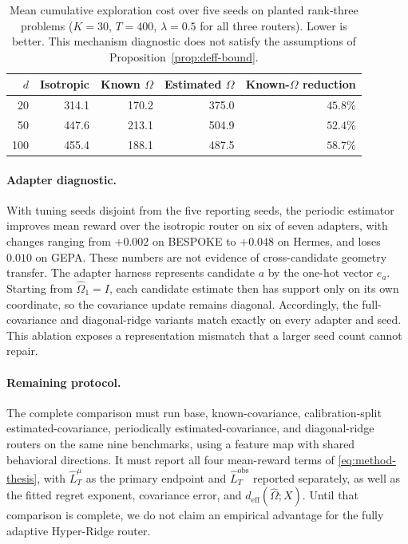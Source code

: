\documentclass{article} %
\begin{document}
\begin{table}[H]
\centering
\small
\begin{tabular}{rrrrr}
\toprule
$d$ & Isotropic & Known $\Omega$ & Estimated $\Omega$ & Known-$\Omega$ reduction \\
\midrule
20  & 314.1 & 170.2 & 375.0 & $45.8\%$ \\
50  & 447.6 & 213.1 & 504.9 & $52.4\%$ \\
100 & 455.4 & 188.1 & 487.5 & $58.7\%$ \\
\bottomrule
\end{tabular}
\caption{Mean cumulative exploration cost over five seeds on planted rank-three problems ($K=30$, $T=400$, $\lambda=0.5$ for all three routers). Lower is better. This mechanism diagnostic does not satisfy the assumptions of Proposition~\ref{prop:deff-bound}.}
\label{tab:hyper-diagnostic}
\end{table}

\paragraph{Adapter diagnostic.}
With tuning seeds disjoint from the five reporting seeds, the periodic estimator improves mean reward over the isotropic router on six of seven adapters, with changes ranging from $+0.002$ on BESPOKE to $+0.048$ on Hermes, and loses $0.010$ on GEPA. These numbers are not evidence of cross-candidate geometry transfer. The adapter harness represents candidate $a$ by the one-hot vector $e_a$. Starting from $\widehat{\Omega}_1=I$, each candidate estimate then has support only on its own coordinate, so the covariance update remains diagonal. Accordingly, the full-covariance and diagonal-ridge variants match exactly on every adapter and seed. This ablation exposes a representation mismatch that a larger seed count cannot repair.

\paragraph{Remaining protocol.}
The complete comparison must run base, known-covariance, calibration-split
estimated-covariance, periodically estimated-covariance, and diagonal-ridge
routers on the same nine benchmarks, using a feature map with shared behavioral
directions. It must report all four mean-reward terms of
\eqref{eq:method-thesis}, with \(\widehat L_T^\mu\) as the primary endpoint
and \(\widehat L_T^{\mathrm{obs}}\) reported separately, as well as the fitted
regret exponent, covariance error, and
\(d_{\mathrm{eff}}(\widehat\Omega;X)\). Until that comparison is complete, we
do not claim an empirical advantage for the fully adaptive Hyper-Ridge router.
\end{document}
